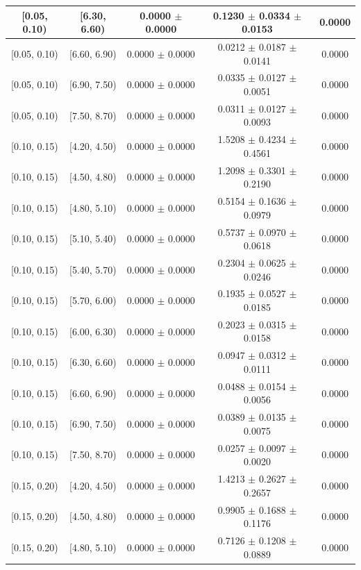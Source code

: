 \begin{longtable}{|c|c|c|c|c|}
\hline
[0.05, 0.10) & [6.30, 6.60) & 0.0000 $\pm$ 0.0000 & 0.1230 $\pm$ 0.0334 $\pm$ 0.0153 & 0.0000 \\ 
\hline
[0.05, 0.10) & [6.60, 6.90) & 0.0000 $\pm$ 0.0000 & 0.0212 $\pm$ 0.0187 $\pm$ 0.0141 & 0.0000 \\ 
\hline
[0.05, 0.10) & [6.90, 7.50) & 0.0000 $\pm$ 0.0000 & 0.0335 $\pm$ 0.0127 $\pm$ 0.0051 & 0.0000 \\ 
\hline
[0.05, 0.10) & [7.50, 8.70) & 0.0000 $\pm$ 0.0000 & 0.0311 $\pm$ 0.0127 $\pm$ 0.0093 & 0.0000 \\ 
\hline
[0.10, 0.15) & [4.20, 4.50) & 0.0000 $\pm$ 0.0000 & 1.5208 $\pm$ 0.4234 $\pm$ 0.4561 & 0.0000 \\ 
\hline
[0.10, 0.15) & [4.50, 4.80) & 0.0000 $\pm$ 0.0000 & 1.2098 $\pm$ 0.3301 $\pm$ 0.2190 & 0.0000 \\ 
\hline
[0.10, 0.15) & [4.80, 5.10) & 0.0000 $\pm$ 0.0000 & 0.5154 $\pm$ 0.1636 $\pm$ 0.0979 & 0.0000 \\ 
\hline
[0.10, 0.15) & [5.10, 5.40) & 0.0000 $\pm$ 0.0000 & 0.5737 $\pm$ 0.0970 $\pm$ 0.0618 & 0.0000 \\ 
\hline
[0.10, 0.15) & [5.40, 5.70) & 0.0000 $\pm$ 0.0000 & 0.2304 $\pm$ 0.0625 $\pm$ 0.0246 & 0.0000 \\ 
\hline
[0.10, 0.15) & [5.70, 6.00) & 0.0000 $\pm$ 0.0000 & 0.1935 $\pm$ 0.0527 $\pm$ 0.0185 & 0.0000 \\ 
\hline
[0.10, 0.15) & [6.00, 6.30) & 0.0000 $\pm$ 0.0000 & 0.2023 $\pm$ 0.0315 $\pm$ 0.0158 & 0.0000 \\ 
\hline
[0.10, 0.15) & [6.30, 6.60) & 0.0000 $\pm$ 0.0000 & 0.0947 $\pm$ 0.0312 $\pm$ 0.0111 & 0.0000 \\ 
\hline
[0.10, 0.15) & [6.60, 6.90) & 0.0000 $\pm$ 0.0000 & 0.0488 $\pm$ 0.0154 $\pm$ 0.0056 & 0.0000 \\ 
\hline
[0.10, 0.15) & [6.90, 7.50) & 0.0000 $\pm$ 0.0000 & 0.0389 $\pm$ 0.0135 $\pm$ 0.0075 & 0.0000 \\ 
\hline
[0.10, 0.15) & [7.50, 8.70) & 0.0000 $\pm$ 0.0000 & 0.0257 $\pm$ 0.0097 $\pm$ 0.0020 & 0.0000 \\ 
\hline
[0.15, 0.20) & [4.20, 4.50) & 0.0000 $\pm$ 0.0000 & 1.4213 $\pm$ 0.2627 $\pm$ 0.2657 & 0.0000 \\ 
\hline
[0.15, 0.20) & [4.50, 4.80) & 0.0000 $\pm$ 0.0000 & 0.9905 $\pm$ 0.1688 $\pm$ 0.1176 & 0.0000 \\ 
\hline
[0.15, 0.20) & [4.80, 5.10) & 0.0000 $\pm$ 0.0000 & 0.7126 $\pm$ 0.1208 $\pm$ 0.0889 & 0.0000 \\ 

\end{longtable}
